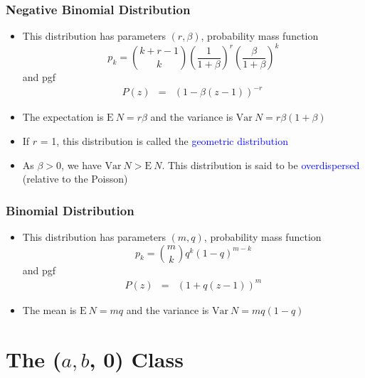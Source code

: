 \documentclass{beamer}
\begin{document}
\begin{frame}%
 \frametitle{Negative Binomial Distribution}
\begin{itemize}
   \item This distribution has parameters $(r, \beta)$, probability mass function
\begin{equation*}
p_k = {k+r-1\choose k} (\frac{1}{1+\beta})^r
(\frac{\beta}{1+\beta})^k
\end{equation*}
and pgf
\begin{eqnarray*}
P(z) &=& (1-\beta(z-1))^{-r}\
\end{eqnarray*} \vspace{2mm}
\item The expectation is $\mathrm{E~}N = r\beta  $ and the variance is $\mathrm{Var~}N =
r\beta(1+\beta)$ \vspace{2mm}

\item If $r$ = 1, this distribution is called the \textcolor{blue}{geometric
distribution} \vspace{2mm}
\item As $\beta>0$, we have $\mathrm{Var~}N >\mathrm{E~}N$. This distribution is said to be \textcolor{blue}{overdispersed} (relative to the Poisson)
 \end{itemize}
\end{frame}

\begin{frame}%
 \frametitle{Binomial Distribution}
\begin{itemize}
   \item This distribution has parameters $(m,q)$, probability mass function
\begin{equation*}
p_k = {m\choose k} q^k (1-q)^{m-k}
\end{equation*}
and pgf
\begin{eqnarray*}
P(z) &=& (1+q(z-1))^m
\end{eqnarray*} \vspace{2mm}
\item The mean is $\mathrm{E~}N = mq$ and the variance is $\mathrm{Var~}N =
mq(1-q)$
 \end{itemize}
\end{frame}

\section{The ($a, b$, 0) Class}
\end{document}
